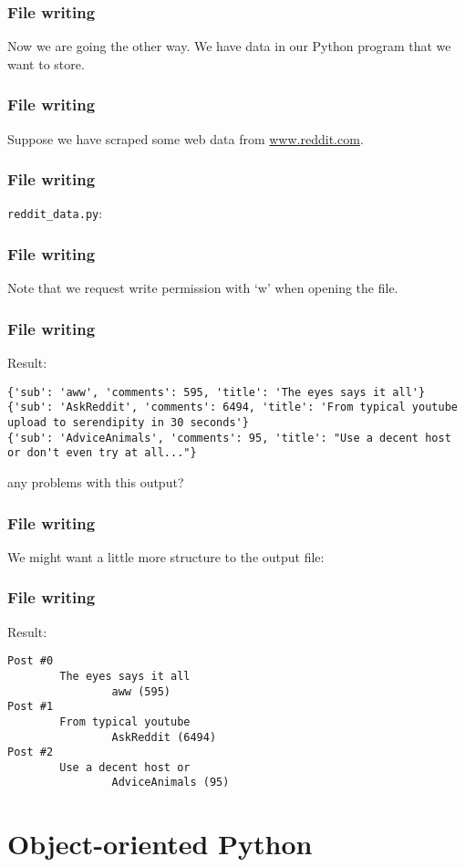 \documentclass{beamer}
\begin{document}
\begin{frame}
\frametitle{File writing}
Now we are going the other way.  We have data in our Python program that we want to store.
\end{frame}

\begin{frame}
\frametitle{File writing}
Suppose we have scraped some web data from \url{www.reddit.com}.
\end{frame}

\begin{frame}
\frametitle{File writing}
\texttt{reddit\_data.py}:
\end{frame}

\begin{frame}
\frametitle{File writing}
Note that we request write permission with `w' when opening the file.
\end{frame}

\begin{frame}[fragile]
\frametitle{File writing}
Result:
\begin{verbatim}
{'sub': 'aww', 'comments': 595, 'title': 'The eyes says it all'}
{'sub': 'AskReddit', 'comments': 6494, 'title': 'From typical youtube upload to serendipity in 30 seconds'}
{'sub': 'AdviceAnimals', 'comments': 95, 'title': "Use a decent host or don't even try at all..."}
\end{verbatim}
\vspace{0.2in}
any problems with this output?
\end{frame}

\begin{frame}
\frametitle{File writing}
We might want a little more structure to the output file:
\end{frame}

\begin{frame}[fragile]
\frametitle{File writing}
Result:
\begin{verbatim}
Post #0
        The eyes says it all
                aww (595)
Post #1
        From typical youtube
                AskReddit (6494)
Post #2
        Use a decent host or
                AdviceAnimals (95)
\end{verbatim}
\end{frame}

\section{Object-oriented Python}
\end{document}
